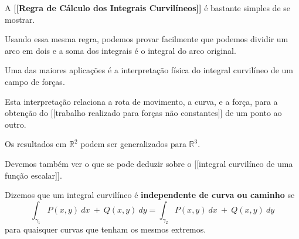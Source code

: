 \documentclass[
]{article}
\begin{document}
A \textbf{{[}{[}Regra de Cálculo dos Integrais Curvilíneos{]}{]}} é
bastante simples de se mostrar.

Usando essa mesma regra, podemos provar facilmente que podemos dividir
um arco em dois e a soma dos integrais é o integral do arco original.

Uma das maiores aplicações é a interpretação física do integral
curvilíneo de um campo de forças.

Esta interpretação relaciona a rota de movimento, a curva, e a força,
para a obtenção do {[}{[}trabalho realizado para forças não
constantes{]}{]} de um ponto ao outro.

Os resultados em \(\mathbb{R}^2\) podem ser generalizados para
\(\mathbb{R}^3\).

Devemos também ver o que se pode deduzir sobre o {[}{[}integral
curvilíneo de uma função escalar{]}{]}.

Dizemos que um integral curvilíneo é \textbf{independente de curva ou
caminho}
se\[\int_{\gamma_{1}}P(x,y)\ dx\ +\ Q(x,y)\ dy=\int_{\gamma_{2}}P(x,y)\ dx\ +\ Q(x,y)\ dy\]para
quaisquer curvas que tenham os mesmos extremos.
\end{document}
